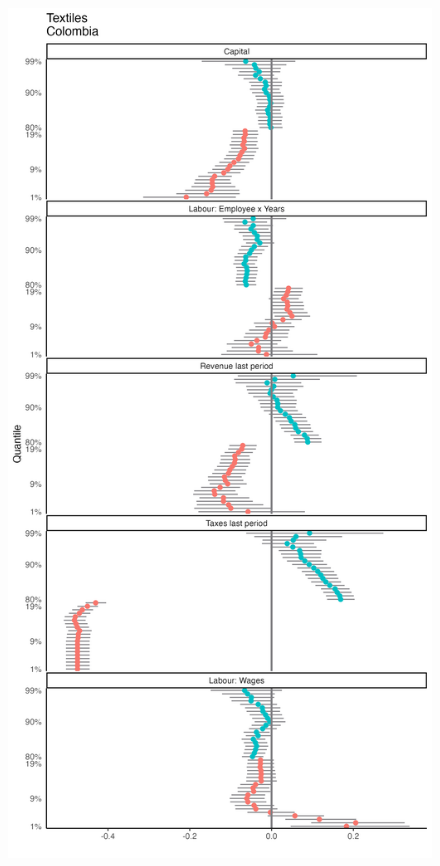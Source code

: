 \documentclass[
  12pt]{article}
\theoremstyle{definition}
\theoremstyle{remark}
\begin{document}
\begin{figure}

{\centering \includegraphics[width=\textwidth,height=1\textheight]{../Results/Figures/Colombia/321_by_size_diff.png}

}

\end{figure}
\end{document}
